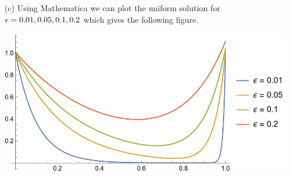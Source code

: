 \documentclass[12pt]{report}
\begin{document}
\begin{solution}
\begin{enumerate}
    \item[(c)]
    Using Mathematica we can plot the uniform solution for ${\epsilon} = 0.01,0.05,0.1,0.2$ which gives the following figure.
    \begin{center}
        \includegraphics[width=.8\textwidth]{p2.png}
    \end{center}
\end{enumerate}
\end{solution}

\newpage
\end{document}
